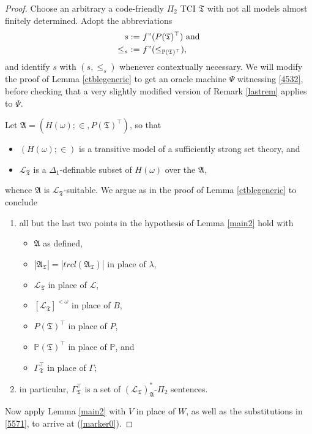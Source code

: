 \documentclass[12pt, twoside]{memoir}
\numberwithin{equation}{section}
\theoremstyle{definition}
\theoremstyle{remark}
\theoremstyle{definition}
\theoremstyle{definition}
\theoremstyle{definition}
\theoremstyle{remark}
\begin{document}
\begin{proof}
Choose an arbitrary a code-friendly $\Pi_2$ TCI $\mathfrak{T}$ with not all models almost finitely determined. Adopt the abbreviations
\begin{align*}
    s := \ & f" (P(\mathfrak{T})^{\top}) \text{ and} \\
    \leq_s \ := \ & f" (\leq_{\mathbb{P}(\mathfrak{T})^{\top}}) \text{,} 
\end{align*}
and identify $s$ with $(s, \leq_s)$ whenever contextually necessary. We will modify the proof of Lemma \ref{ctblegeneric} to get an oracle machine $\Psi$ witnessing \ref{4532}, before checking that a very slightly modified version of Remark \ref{lastrem} applies to $\Psi$. 

Let $\mathfrak{A} = (H(\omega); \in, P(\mathfrak{T})^{\top})$, so that 
\begin{itemize}
    \item $(H(\omega); \in)$ is a transitive model of a sufficiently strong set theory, and
    \item $\mathcal{L}_{\mathfrak{T}}$ is a $\Delta_1$-definable subset of $H(\omega)$ over the $\mathfrak{A}$,
\end{itemize}
whence $\mathfrak{A}$ is $\mathcal{L}_{\mathfrak{T}}$-suitable. We argue as in the proof of Lemma \ref{ctblegeneric} to conclude 
\begin{enumerate}[label=(\Roman*)]
    \item\label{5571} all but the last two points in the hypothesis of Lemma \ref{main2} hold with
    \begin{itemize}
        \item $\mathfrak{A}$ as defined,
        \item $|\mathfrak{A}_{\mathfrak{T}}| = |trcl(\mathfrak{A}_{\mathfrak{T}})|$ in place of $\lambda$,
        \item $\mathcal{L}_{\mathfrak{T}}$ in place of $\mathcal{L}$,
        \item $[\mathcal{L}_{\mathfrak{T}}]^{< \omega}$ in place of $B$,
        \item $P(\mathfrak{T})^{\top}$ in place of $P$,
        \item $\mathbb{P}(\mathfrak{T})^{\top}$ in place of $\mathbb{P}$, and
        \item $\Gamma_{\mathfrak{T}}^{\top}$ in place of $\Gamma$;
    \end{itemize} 
    \item\label{5572} in particular, $\Gamma_{\mathfrak{T}}^{\top}$ is a set of $(\mathcal{L}_{\mathfrak{T}})^*_{\mathfrak{A}}$-$\Pi_2$ sentences.
\end{enumerate}
Now apply Lemma \ref{main2} with $V$ in place of $W$, as well as the substitutions in \ref{5571}, to arrive at (\ref{marker0}).


\end{proof}
\end{document}
